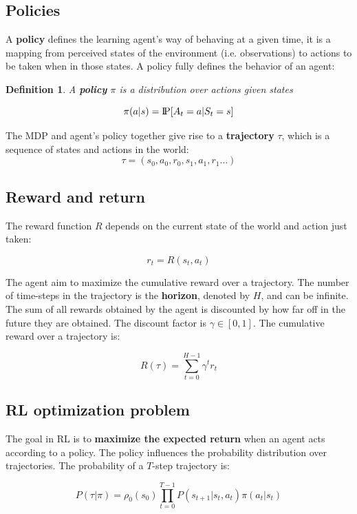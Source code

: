 \documentclass{article}
\newtheorem{definition}{Definition}
\newcommand{\Pprob}{\text{I\kern-0.15em P}}
\begin{document}
\subsection{Policies}
A \textbf{policy} defines the learning agent's way of behaving at a given time, it is a mapping from perceived states of the environment (i.e. observations) to actions to be taken when in those states. A policy fully defines the behavior of an agent:

\begin{definition}
	 A \textbf{policy} $\pi$ is a distribution over actions given states
	
	\begin{equation}
	\pi(a | s) = \Pprob[A_t=a|S_t=s]
	\end{equation}

\end{definition}

The MDP and agent's policy together give rise to a \textbf{trajectory} $\tau$, which is a sequence of states and actions in the world:
$$\tau = (s_0, a_0, r_0, s_1, a_1, r_1...)$$


\subsection{Reward and return}
The reward function $R$ depends on the current state of the world and action just taken:

$$r_t = R(s_t, a_t)$$

The agent aim to maximize the cumulative reward over a trajectory. The number of time-steps in the trajectory is the \textbf{horizon}, denoted by $H$, and can be infinite. The sum of all rewards obtained by the agent is discounted by how far off in the future they are obtained. The discount factor is $\gamma \in [0,1]$. The cumulative reward over a trajectory is:

\begin{equation}
R(\tau) = \sum_{t=0}^{H-1} \gamma^t r_t
\end{equation}

\subsection{RL optimization problem}
The goal in RL is to \textbf{maximize the expected return} when an agent acts according to a policy. The policy influences the probability distribution over trajectories. The probability of a $T$-step trajectory is:

\begin{equation}
P(\tau|\pi) = \rho_0 (s_0) \prod_{t=0}^{T-1} P(s_{t+1} | s_t, a_t) \pi(a_t | s_t)
\end{equation}
\end{document}
